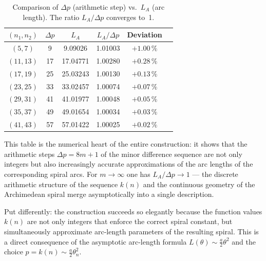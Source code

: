 \begin{table}[H]
\centering
\caption{Comparison of $\Delta p$ (arithmetic step) vs.\ $L_A$ (arc length).
  The ratio $L_A / \Delta p$ converges to~1.}
\renewcommand{\arraystretch}{1.2}
\begin{tabular}{cccccc}
\toprule
$(n_1, n_2)$ & $\Delta p$ & $L_A$ & $L_A / \Delta p$ & Deviation \\
\midrule
$( 5,  7)$ &  9 &  9.09026 & 1.01003 & $+1.00\,\%$ \\
$(11, 13)$ & 17 & 17.04771 & 1.00280 & $+0.28\,\%$ \\
$(17, 19)$ & 25 & 25.03243 & 1.00130 & $+0.13\,\%$ \\
$(23, 25)$ & 33 & 33.02457 & 1.00074 & $+0.07\,\%$ \\
$(29, 31)$ & 41 & 41.01977 & 1.00048 & $+0.05\,\%$ \\
$(35, 37)$ & 49 & 49.01654 & 1.00034 & $+0.03\,\%$ \\
$(41, 43)$ & 57 & 57.01422 & 1.00025 & $+0.02\,\%$ \\
\bottomrule
\end{tabular}
\end{table}

\begin{remark}
This table is the numerical heart of the entire construction: it shows
that the arithmetic steps $\Delta p = 8m+1$ of the minor difference sequence
are not only integers but also increasingly accurate approximations of the
arc lengths of the corresponding spiral arcs. For $m \to \infty$ one has
$L_A / \Delta p \to 1$ --- the discrete arithmetic structure of the sequence $k(n)$
and the continuous geometry of the Archimedean spiral merge
asymptotically into a single description.

Put differently: the construction succeeds so elegantly because the
function values $k(n)$ are not only integers that enforce the correct spiral
constant, but simultaneously approximate arc-length parameters of the
resulting spiral. This is a direct consequence
of the asymptotic arc-length formula $L(\theta) \sim \frac{a}{2}\theta^2$ and
the choice $p = k(n) \sim \frac{a}{2}\theta_n^2$.
\end{remark}

